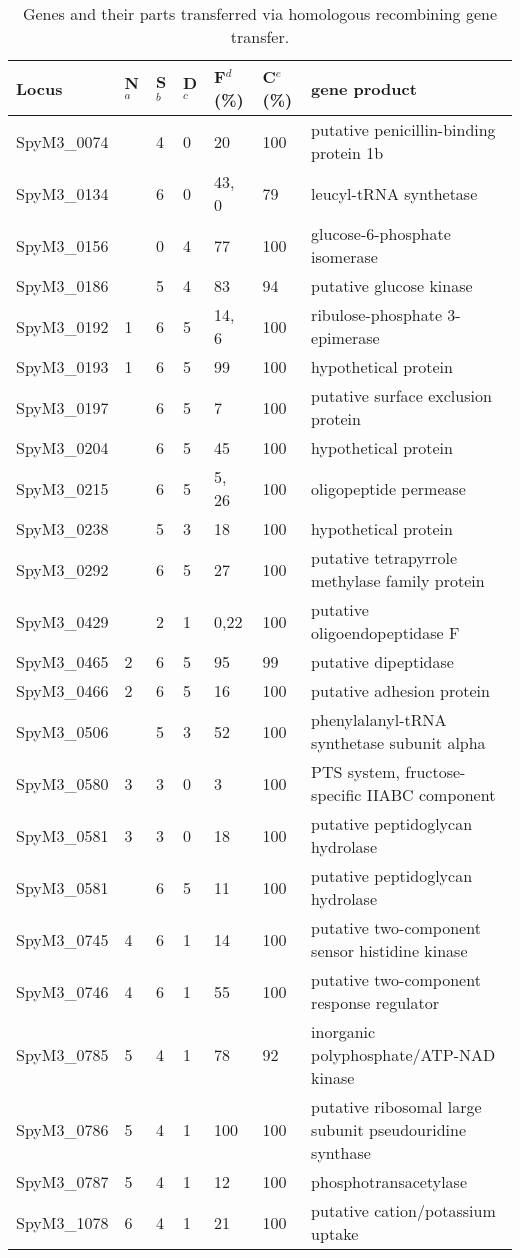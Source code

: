 \documentclass[english]{article}
\providecommand{\tabularnewline}{\\}
\begin{document}
\begin{table}
\caption{\label{tab:genes-transfer}Genes and their parts transferred via 
homologous
recombining gene transfer. }
{\footnotesize
\begin{tabular}{lllllll}
\hline 
Locus  & N$^a$  & S$^b$  & D$^c$ & F$^d$(\%)  & C$^e$(\%)  & gene 
product\tabularnewline
\hline 
SpyM3\_0074  &  & 4  & 0  & 20  & 100  & putative penicillin-binding protein 1b 
\tabularnewline
SpyM3\_0134  &  & 6  & 0  & 43, 0 & 79  & leucyl-tRNA synthetase \tabularnewline
SpyM3\_0156  &  & 0  & 4  & 77  & 100  & glucose-6-phosphate isomerase 
\tabularnewline
SpyM3\_0186  &  & 5  & 4  & 83  & 94  & putative glucose kinase \tabularnewline
SpyM3\_0192  & 1 & 6  & 5  & 14, 6 & 100  & ribulose-phosphate 3-epimerase 
\tabularnewline
SpyM3\_0193  & 1 & 6  & 5  & 99  & 100  & hypothetical protein\tabularnewline
SpyM3\_0197  &  & 6  & 5  & 7  & 100  & putative surface exclusion 
protein\tabularnewline
SpyM3\_0204  &  & 6  & 5  & 45  & 100  & hypothetical protein \tabularnewline
SpyM3\_0215  &  & 6  & 5  & 5, 26 & 100  & oligopeptide permease \tabularnewline
SpyM3\_0238  &  & 5  & 3  & 18  & 100  & hypothetical protein \tabularnewline
SpyM3\_0292  &  & 6  & 5  & 27  & 100  & putative tetrapyrrole methylase family 
protein \tabularnewline
SpyM3\_0429  &  & 2  & 1  & 0,22  & 100  & putative oligoendopeptidase 
F\tabularnewline
SpyM3\_0465  & 2 & 6  & 5  & 95  & 99  & putative dipeptidase \tabularnewline
SpyM3\_0466  & 2 & 6  & 5  & 16  & 100  & putative adhesion protein 
\tabularnewline
SpyM3\_0506  &  & 5  & 3  & 52  & 100  & phenylalanyl-tRNA synthetase subunit 
alpha \tabularnewline
SpyM3\_0580  & 3 & 3  & 0  & 3  & 100  & PTS system, fructose-specific IIABC 
component\tabularnewline
SpyM3\_0581  & 3 & 3  & 0  & 18  & 100  & putative peptidoglycan hydrolase 
\tabularnewline
SpyM3\_0581  &  & 6  & 5  & 11  & 100  & putative peptidoglycan hydrolase 
\tabularnewline
SpyM3\_0745  & 4 & 6  & 1  & 14  & 100  & putative two-component sensor 
histidine kinase \tabularnewline
SpyM3\_0746  & 4 & 6  & 1  & 55  & 100  & putative two-component response 
regulator \tabularnewline
SpyM3\_0785  & 5 & 4  & 1  & 78  & 92  & inorganic polyphosphate/ATP-NAD 
kinase\tabularnewline
SpyM3\_0786  & 5 & 4  & 1  & 100  & 100  & putative ribosomal large subunit 
pseudouridine synthase \tabularnewline
SpyM3\_0787  & 5 & 4  & 1  & 12  & 100  & phosphotransacetylase \tabularnewline
SpyM3\_1078  & 6 & 4  & 1  & 21  & 100  & putative cation/potassium uptake 

\end{tabular}}
\end{table}
\end{document}

